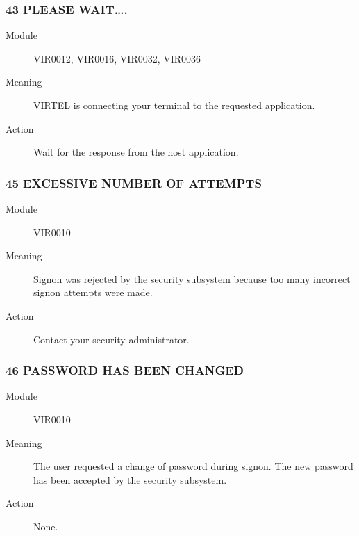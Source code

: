 \documentclass[letterpaper,10pt,english]{sphinxmanual}
\begin{document}
\subsubsection{43 PLEASE WAIT….}
\label{\detokenize{messages:please-wait}}\begin{description}
\item[{Module}] \leavevmode
VIR0012, VIR0016, VIR0032, VIR0036

\item[{Meaning}] \leavevmode
VIRTEL is connecting your terminal to the requested application.

\item[{Action}] \leavevmode
Wait for the response from the host application.

\end{description}


\subsubsection{45 EXCESSIVE NUMBER OF ATTEMPTS}
\label{\detokenize{messages:excessive-number-of-attempts}}\begin{description}
\item[{Module}] \leavevmode
VIR0010

\item[{Meaning}] \leavevmode
Signon was rejected by the security subsystem because too many incorrect signon attempts were made.

\item[{Action}] \leavevmode
Contact your security administrator.

\end{description}


\subsubsection{46 PASSWORD HAS BEEN CHANGED}
\label{\detokenize{messages:password-has-been-changed}}\begin{description}
\item[{Module}] \leavevmode
VIR0010

\item[{Meaning}] \leavevmode
The user requested a change of password during signon. The new password has been accepted by the security subsystem.

\item[{Action}] \leavevmode
None.

\end{description}
\end{document}
